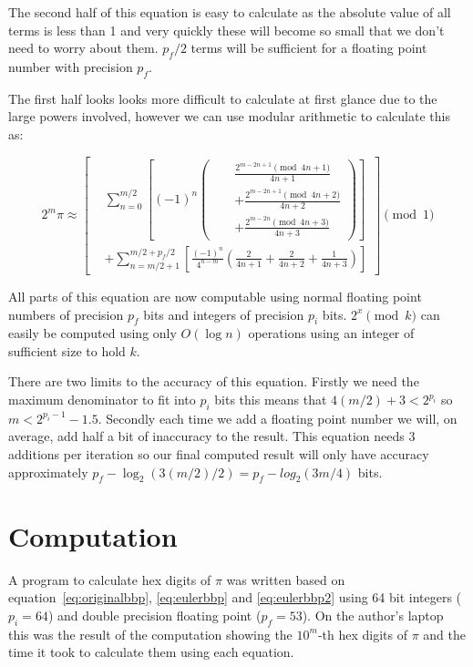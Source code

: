 \documentclass[11pt]{article}
\begin{document}
The second half of this equation is easy to calculate as the absolute value of all terms is less than 1 and very quickly these will become so small that we don't need to worry about them. $p_f/2$ terms will be sufficient for a floating point number with precision $p_f$.

The first half looks looks more difficult to calculate at first glance due to the large powers involved, however we can use modular arithmetic to calculate this as:

\begin{equation}
  2^m \pi \approx \left[
    \begin{aligned}
      &\sum_{n = 0}^{m/2} \left[ (-1)^n \left(
        \begin{aligned}
          && \frac{2^{m-2n+1} \pmod{4n + 1}}{4n + 1} \\
          &&+ \frac{2^{m-2n+1} \pmod{4n + 2}}{4n + 2} \\
          &&+ \frac{2^{m-2n} \pmod{4n + 3}}{4n + 3}
        \end{aligned}
        \right) \right] \\
      &+ \sum_{n = m/2+1}^{m/2+p_f/2} \left[ \frac{(-1)^n}{4^{n-m}} \left( \frac{2}{4n + 1} + \frac{2}{4n + 2} + \frac{1}{4n + 3} \right) \right]
\end{aligned}
    \right] \pmod 1
\end{equation}

All parts of this equation are now computable using normal floating point numbers of precision $p_f$ bits and integers of precision $p_i$ bits. $2^x \pmod k$ can easily be computed using only $O(\log{n})$ operations \cite{Knuth_1995} using an integer of sufficient size to hold $k$.

There are two limits to the accuracy of this equation. Firstly we need the maximum denominator to fit into $p_i$ bits this means that $4(m/2)+3 < 2^{p_i}$ so $m < 2^{p_i-1}-1.5$. Secondly each time we add a floating point number we will, on average, add half a bit of inaccuracy to the result. This equation needs 3 additions per iteration so our final computed result will only have accuracy approximately $p_f - \log_2{(3(m/2)/2)} = p_f - log_2(3m/4)$ bits.

\section{Computation}

A program to calculate hex digits of $\pi$ was written based on equation~\eqref{eq:originalbbp}, \eqref{eq:eulerbbp} and \eqref{eq:eulerbbp2} using 64 bit integers ($p_i = 64$) and double precision floating point ($p_f = 53$). On the author's laptop this was the result of the computation showing the $10^{m}$-th hex digits of $\pi$ and the time it took to calculate them using each equation.
\end{document}
